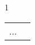 \documentclass[a4paper]{article}
\begin{document}
1 \begin{tabular}{|>{\centering\ttfamily}p{5em}
    |>{$}c<{$}|}
    ...
    \end{tabular}
\end{document}
